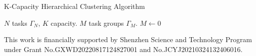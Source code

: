 \documentclass[sigconf,anonymous]{aamas}
\begin{document}
\begin{algorithm}[ht]
\caption{K-Capacity Hierarchical Clustering Algorithm}
\label{alg:KCHC}
\begin{algorithmic}
\REQUIRE $N$ tasks $\Gamma_{N}$, $K$ capacity.
\ENSURE $M$ task groups $\Gamma_{M}$.
\STATE $M \leftarrow 0$
\end{algorithmic}
\end{algorithm}

\balance



\begin{acks}
  This work is financially supported by Shenzhen Science and Technology Program 
  under Grant No.GXWD20220817124827001 and No.JCYJ20210324132406016.
\end{acks}



 


\end{document}
